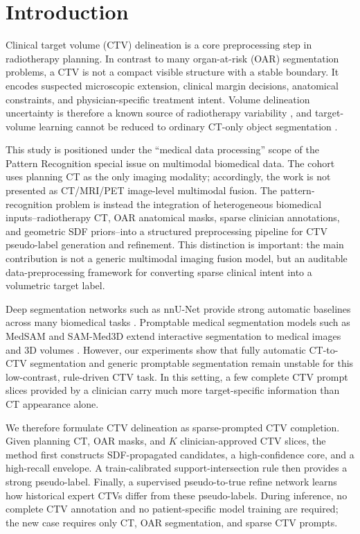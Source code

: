 \documentclass[preprint,12pt]{elsarticle}
\begin{document}
\section{Introduction}

Clinical target volume (CTV) delineation is a core preprocessing step in radiotherapy planning. In contrast to many organ-at-risk (OAR) segmentation problems, a CTV is not a compact visible structure with a stable boundary. It encodes suspected microscopic extension, clinical margin decisions, anatomical constraints, and physician-specific treatment intent. Volume delineation uncertainty is therefore a known source of radiotherapy variability \cite{vinod2016uncertainties}, and target-volume learning cannot be reduced to ordinary CT-only object segmentation \cite{sharp2014vision,men2021deeptarget}.

This study is positioned under the ``medical data processing'' scope of the Pattern Recognition special issue on multimodal biomedical data. The cohort uses planning CT as the only imaging modality; accordingly, the work is not presented as CT/MRI/PET image-level multimodal fusion. The pattern-recognition problem is instead the integration of heterogeneous biomedical inputs--radiotherapy CT, OAR anatomical masks, sparse clinician annotations, and geometric SDF priors--into a structured preprocessing pipeline for CTV pseudo-label generation and refinement. This distinction is important: the main contribution is not a generic multimodal imaging fusion model, but an auditable data-preprocessing framework for converting sparse clinical intent into a volumetric target label.

Deep segmentation networks such as nnU-Net provide strong automatic baselines across many biomedical tasks \cite{isensee2021nnunet}. Promptable medical segmentation models such as MedSAM and SAM-Med3D extend interactive segmentation to medical images and 3D volumes \cite{ma2024medsam,wang2023sammed3d}. However, our experiments show that fully automatic CT-to-CTV segmentation and generic promptable segmentation remain unstable for this low-contrast, rule-driven CTV task. In this setting, a few complete CTV prompt slices provided by a clinician carry much more target-specific information than CT appearance alone.

We therefore formulate CTV delineation as sparse-prompted CTV completion. Given planning CT, OAR masks, and $K$ clinician-approved CTV slices, the method first constructs SDF-propagated candidates, a high-confidence core, and a high-recall envelope. A train-calibrated support-intersection rule then provides a strong pseudo-label. Finally, a supervised pseudo-to-true refine network learns how historical expert CTVs differ from these pseudo-labels. During inference, no complete CTV annotation and no patient-specific model training are required; the new case requires only CT, OAR segmentation, and sparse CTV prompts.
\end{document}

